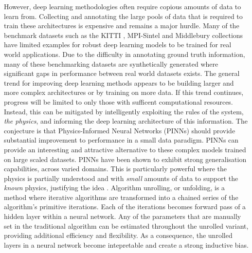 \IEEEPARstart{} However, deep learning methodologies often require copious amounts of data to learn from. Collecting and annotating the large pools of data that is required to train these architectures is expensive and remains a major hurdle. Many of the benchmark datasets such as the KITTI \cite{geiger2012we}, MPI-Sintel \cite{butler2012naturalistic} and Middlebury \cite{baker2011database} collections have limited examples for robust deep learning models to be trained for real world applications. Due to the difficulty in annotating ground truth information, many of these benchmarking datasets are synthetically generated where significant gaps in performance between real world datasets exists. 
\IEEEPARstart{} The general trend for improving deep learning methods appears to be building larger and more complex architectures or by training on more data. If this trend continues, progress will be limited to only those with sufficent computational resources. Instead, this can be mitigated by intelligently exploiting the rules of the system, \textit{the physics}, and informing the deep learning architecture of this information. The conjecture is that Physics-Informed Neural Networks (PINNs) should provide substantial improvement to performance in a small data paradigm. PINNs can provide an interesting and attractive alternative to these complex models trained on large scaled datasets. PINNs have been shown to exhibit strong generalisation capabilities, across varied domains. This is particularly powerful where the physics is partially understood and with \textit{small} amounts of data to support the \textit{known} physics, justifying the idea \cite{raissi2017physics,raissi2017machine,grigo2019physics,karniadakis2021physics}.
\IEEEPARstart{}{} Algorithm unrolling, or unfolding, is a method where iterative algorithms are transformed into a chained series of the algorithm's primitive iterations. Each of the iterations becomes forward pass of a hidden layer within a neural network. Any of the parameters that are manually set in the traditional algorithm can be estimated throughout the unrolled variant, providing additional efficiency and flexibility. As a consequence, the unrolled layers in a neural network become intepretable and create a strong inductive bias. %
